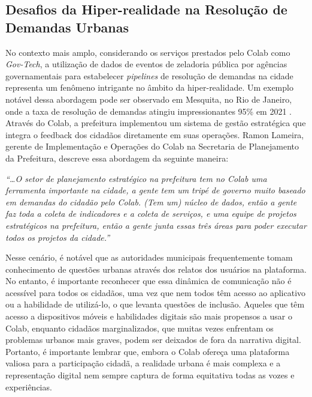 \subsection*{Desafios da Hiper-realidade na Resolução de Demandas Urbanas}

No contexto mais amplo, considerando os serviços prestados pelo Colab como \textit{Gov-Tech}, a utilização de dados de eventos de zeladoria pública por agências governamentais para estabelecer \textit{pipelines} de resolução de demandas na cidade representa um fenômeno intrigante no âmbito da hiper-realidade. Um exemplo notável dessa abordagem pode ser observado em Mesquita, no Rio de Janeiro, onde a taxa de resolução de demandas atingiu impressionantes 95\% em 2021 \cite{2021_Colab_PAGE}. Através do Colab, a prefeitura implementou um sistema de gestão estratégica que integra o feedback dos cidadãos diretamente em suas operações. Ramon Lameira, gerente de Implementação e Operações do Colab na Secretaria de Planejamento da Prefeitura, descreve essa abordagem da seguinte maneira:

\begin{citacao}
\textit{“…O setor de planejamento estratégico na prefeitura tem no Colab uma ferramenta importante na cidade, a gente tem um tripé de governo muito baseado em demandas do cidadão pelo Colab. (Tem um) núcleo de dados, então a gente faz toda a coleta de indicadores e a coleta de serviços, e uma equipe de projetos estratégicos na prefeitura, então a gente junta essas três áreas para poder executar todos os projetos da cidade.”}
\end{citacao}

Nesse cenário, é notável que as autoridades municipais frequentemente tomam conhecimento de questões urbanas através dos relatos dos usuários na plataforma. No entanto, é importante reconhecer que essa dinâmica de comunicação não é acessível para todos os cidadãos, uma vez que nem todos têm acesso ao aplicativo ou a habilidade de utilizá-lo, o que levanta questões de inclusão. Aqueles que têm acesso a dispositivos móveis e habilidades digitais são mais propensos a usar o Colab, enquanto cidadãos marginalizados, que muitas vezes enfrentam os problemas urbanos mais graves, podem ser deixados de fora da narrativa digital. Portanto, é importante lembrar que, embora o Colab ofereça uma plataforma valiosa para a participação cidadã, a realidade urbana é mais complexa e a representação digital nem sempre captura de forma equitativa todas as vozes e experiências.

